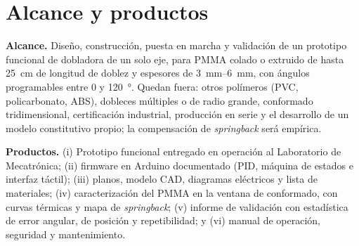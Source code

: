 \section{Alcance y productos}

\noindent\textbf{Alcance.} Diseño, construcción, puesta en marcha y validación de un prototipo funcional de dobladora de un solo eje, para PMMA colado o extruido de hasta \SI{25}{\centi\meter} de longitud de doblez y espesores de \SIrange{3}{6}{\milli\meter}, con ángulos programables entre \num{0} y \SI{120}{\degree}. Quedan fuera: otros polímeros (PVC, policarbonato, ABS), dobleces múltiples o de radio grande, conformado tridimensional, certificación industrial, producción en serie y el desarrollo de un modelo constitutivo propio; la compensación de \emph{springback} será empírica.

\noindent\textbf{Productos.} (i) Prototipo funcional entregado en operación al Laboratorio de Mecatrónica; (ii) firmware en Arduino documentado (PID, máquina de estados e interfaz táctil); (iii) planos, modelo CAD, diagramas eléctricos y lista de materiales; (iv) caracterización del PMMA en la ventana de conformado, con curvas térmicas y mapa de \emph{springback}; (v) informe de validación con estadística de error angular, de posición y repetibilidad; y (vi) manual de operación, seguridad y mantenimiento.
